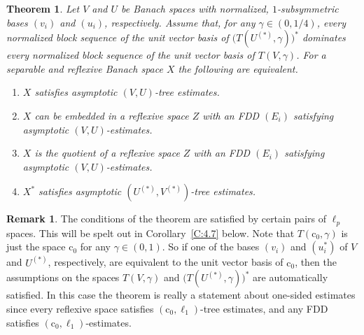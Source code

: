 \documentclass[11pt,leqno]{amsart}
\newtheorem{thm}{Theorem}[section]
\theoremstyle{definition}
\newtheorem*{remark}{Remark}
\newcommand{\co}{\mathrm{c}_0}
\newcommand{\Us}{U^{(*)}}
\newcommand{\Vs}{V^{(*)}}
\begin{document}
\begin{thm}\label{T:4.6}
  Let $V$ and $U$ be Banach spaces with normalized, $1$-subsymmetric
 bases $(v_i)$ and $(u_i)$, respectively. Assume that, for any
 $\gamma\in(0,1/4)$, every normalized block sequence of the unit
 vector basis of $\big(T(\Us,\gamma)\big)^*$ dominates every
 normalized block sequence of the unit vector basis of
 $T(V,\gamma)$. For a separable and reflexive Banach space $X$ the
 following are equivalent.
  \begin{enumerate}
  \item[a)]
    $X$ satisfies asymptotic $(V,U)$-tree estimates.
  \item[b)]
    $X$ can be embedded in a reflexive space $Z$ with an FDD $(E_i)$
    satisfying asymptotic $(V,U)$-estimates.
  \item[c)]
    $X$  is the quotient of a reflexive space $Z$ with an FDD $(E_i)$
    satisfying asymptotic  $(V,U)$-estimates.
  \item[d)]
    $X^*$ satisfies asymptotic $(\Us,\Vs)$-tree estimates.
  \end{enumerate}
\end{thm}
\begin{remark}
  The conditions of the theorem are satisfied by certain pairs of
  $\ell_p$ spaces. This will be spelt out in Corollary~\ref{C:4.7}
  below. Note that $T(\co,\gamma)$ is just the space $\co$ for any
  $\gamma\in(0,1)$. So if one of the bases $(v_i)$ and $(u_i^*)$ of
  $V$ and $\Us$, respectively, are equivalent to the unit vector basis
  of $\co$, then the assumptions on the spaces $T(V,\gamma)$ and
  $\big(T(\Us,\gamma)\big)^*$ are automatically satisfied. In this
  case the theorem is really a statement about one-sided estimates
  since every reflexive space satisfies $(\co,\ell_1)$-tree estimates,
  and any FDD satisfies $(\co,\ell_1)$-estimates.
\end{remark}
\end{document}
